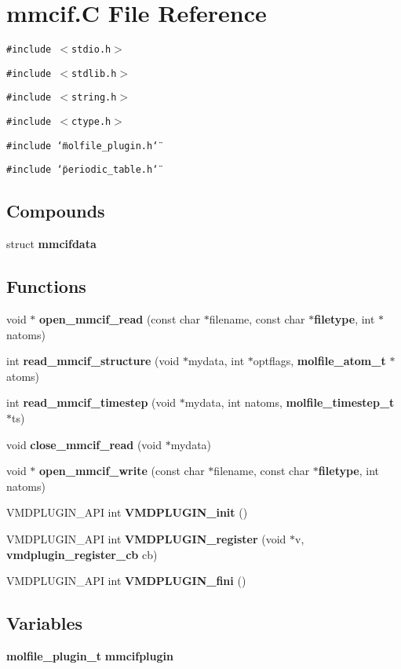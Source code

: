 \section{mmcif.C File Reference}
\label{mmcif_8C}
{\tt \#include $<$stdio.h$>$}\par
{\tt \#include $<$stdlib.h$>$}\par
{\tt \#include $<$string.h$>$}\par
{\tt \#include $<$ctype.h$>$}\par
{\tt \#include \char`\"{}molfile\_\-plugin.h\char`\"{}}\par
{\tt \#include \char`\"{}periodic\_\-table.h\char`\"{}}\par
\subsection*{Compounds}
\begin{CompactItemize}
\item 
struct {\bf mmcifdata}
\end{CompactItemize}
\subsection*{Functions}
\begin{CompactItemize}
\item 
void $\ast$ {\bf open\_\-mmcif\_\-read} (const char $\ast$filename, const char $\ast${\bf filetype}, int $\ast$natoms)
\item 
int {\bf read\_\-mmcif\_\-structure} (void $\ast$mydata, int $\ast$optflags, {\bf molfile\_\-atom\_\-t} $\ast$atoms)
\item 
int {\bf read\_\-mmcif\_\-timestep} (void $\ast$mydata, int natoms, {\bf molfile\_\-timestep\_\-t} $\ast$ts)
\item 
void {\bf close\_\-mmcif\_\-read} (void $\ast$mydata)
\item 
void $\ast$ {\bf open\_\-mmcif\_\-write} (const char $\ast$filename, const char $\ast${\bf filetype}, int natoms)
\item 
VMDPLUGIN\_\-API int {\bf VMDPLUGIN\_\-init} ()
\item 
VMDPLUGIN\_\-API int {\bf VMDPLUGIN\_\-register} (void $\ast$v, {\bf vmdplugin\_\-register\_\-cb} cb)
\item 
VMDPLUGIN\_\-API int {\bf VMDPLUGIN\_\-fini} ()
\end{CompactItemize}
\subsection*{Variables}
\begin{CompactItemize}
\item 
{\bf molfile\_\-plugin\_\-t} {\bf mmcifplugin}
\end{CompactItemize}


